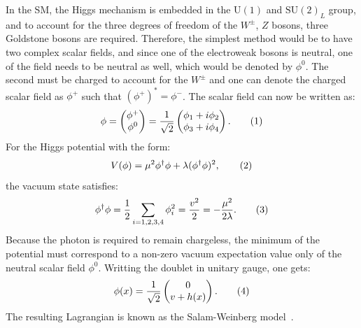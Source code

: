 In the SM, the Higgs mechanism is embedded in the $\text{U}(1)$ and $\text{SU}(2)_L$
group, and to account for the three degrees of freedom of the $W^\pm$, $Z$
bosons, three Goldstone bosons are required. 
Therefore, the simplest method would be to have two complex scalar fields, 
and since one of the electroweak bosons is neutral, one of the field needs to be neutral as well, 
which would be denoted by $\phi^0$. The second must be charged to account for the
$W^\pm$ and one can denote the charged scalar field as $\phi^+$ such that $(\phi^+)^* = \phi^-$.
The scalar field can now be written as:
\[
\phi = \begin{pmatrix} \phi^+ \\ \phi^0 \\ \end{pmatrix}  = \frac{1}{\sqrt{2}}
\begin{pmatrix} \phi_1+i\phi_2 \\ \phi_3+i\phi_4  \\ \end{pmatrix} .
\addtag \]
For the Higgs potential with the form:
\[
V(\phi)     = \mu^2\phi^\dagger\phi + \lambda(\phi^\dagger\phi)^2,
\addtag \]
the vacuum state satisfies:
\[ 
\phi^\dagger \phi = \frac{1}{2} \sum_{i=1,2,3,4}\phi_i^2 = \frac{v^2}{2} 
= -\frac{\mu^2}{2\lambda}.
\addtag \]
Because the photon is required to remain chargeless, the minimum of the 
potential must correspond to a non-zero vacuum expectation value only of the 
neutral scalar field $\phi^0$. 
Writting the doublet in unitary gauge, one gets:
\[
\phi(x)  = \frac{1}{\sqrt{2}} \begin{pmatrix}0 \\ v + h(x)\\ \end{pmatrix}.
\addtag \]
The resulting Lagrangian is known as the 
Salam-Weinberg model~\cite{Glashow,Salam,Weinberg}. 


